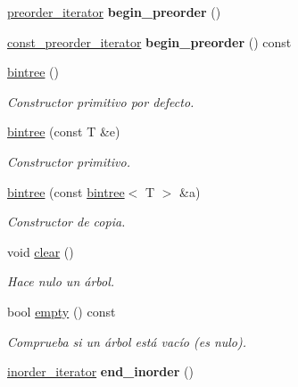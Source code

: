 \begin{DoxyCompactItemize}
\item 
\hypertarget{classbintree_aa03570e8e81b0f6e12a0901caa631973}{}\hyperlink{classbintree_1_1preorder__iterator}{preorder\+\_\+iterator} {\bfseries begin\+\_\+preorder} ()\label{classbintree_aa03570e8e81b0f6e12a0901caa631973}

\item 
\hypertarget{classbintree_ac0e75f2d7528b74174f0733e19e31024}{}\hyperlink{classbintree_1_1const__preorder__iterator}{const\+\_\+preorder\+\_\+iterator} {\bfseries begin\+\_\+preorder} () const \label{classbintree_ac0e75f2d7528b74174f0733e19e31024}

\item 
\hyperlink{classbintree_a9fed4a26a9c177dfa14a9cb573b43dca}{bintree} ()
\begin{DoxyCompactList}\small\item\em Constructor primitivo por defecto. \end{DoxyCompactList}\item 
\hyperlink{classbintree_a21aaa03b1510c5ffa52236d2a8973273}{bintree} (const T \&e)
\begin{DoxyCompactList}\small\item\em Constructor primitivo. \end{DoxyCompactList}\item 
\hyperlink{classbintree_a4658c6df869d8b35a72b6cbcf410bc5f}{bintree} (const \hyperlink{classbintree}{bintree}$<$ T $>$ \&a)
\begin{DoxyCompactList}\small\item\em Constructor de copia. \end{DoxyCompactList}\item 
void \hyperlink{classbintree_a2078f7f9254a84b592fdb1f2e2f9238a}{clear} ()
\begin{DoxyCompactList}\small\item\em Hace nulo un árbol. \end{DoxyCompactList}\item 
bool \hyperlink{classbintree_a772126c3e8b7cd37e5a93ccbda01f8dd}{empty} () const 
\begin{DoxyCompactList}\small\item\em Comprueba si un árbol está vacío (es nulo). \end{DoxyCompactList}\item 
\hypertarget{classbintree_a01bef6192ff6547bd468847efb9f7cd5}{}\hyperlink{classbintree_1_1inorder__iterator}{inorder\+\_\+iterator} {\bfseries end\+\_\+inorder} ()\label{classbintree_a01bef6192ff6547bd468847efb9f7cd5}


\end{DoxyCompactItemize}
